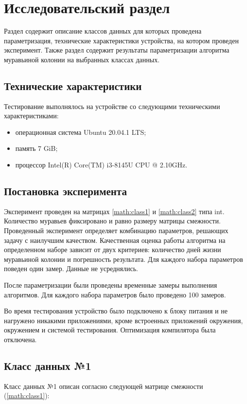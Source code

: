 \chapter{Исследовательский раздел}\label{sec:exp}
Раздел содержит описание классов данных для которых проведена параметризация, технические характеристики устройства, на котором проведен эксперимент. Также раздел содержит результаты параметризации алгоритма муравьиной колонии на выбранных классах данных.
\section{Технические характеристики}
Тестирование выполнялось на устройстве со следующими техническими характеристиками:
\begin{itemize}
	\item операционная система Ubuntu 20.04.1 LTS;
	\item память 7 GiB;
	\item процессор Intel(R) Core(TM) i3-8145U CPU @ 2.10GHz.
\end{itemize}

\section{Постановка эксперимента}
Эксперимент проведен на матрицах \ref{math:class1} и \ref{math:class2} типа int. Количество муравьев фиксировано и равно размеру матрицы смежности. 
Проведенный эксперимент определяет комбинацию параметров, решающих задачу с наилучшим качеством. Качественная оценка работы алгоритма на определенном наборе зависит от двух критериев: количество дней жизни муравьиной колонии и погрешность результата. Для каждого набора параметров поведен один замер. Данные не усреднялись.

После параметризации были проведены временные замеры выполнения алгоритмов. Для каждого набора параметров было проведено 100 замеров.

Во время тестирования устройство было подключено к блоку питания и не нагружено никакими приложениями, кроме встроенных приложений окружения, окружением и системой тестирования. Оптимизация компилятора была отключена.

\section{Класс данных №1}

Класс данных №1 описан согласно следующей матрице смежности (\ref{math:class1}): 

